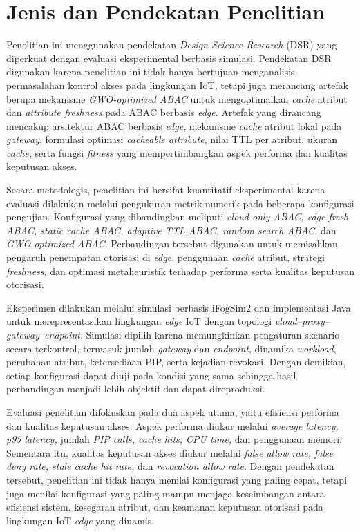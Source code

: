 \section{Jenis dan Pendekatan Penelitian}

Penelitian ini menggunakan pendekatan \textit{Design Science Research} (DSR) yang diperkuat dengan evaluasi eksperimental berbasis simulasi. Pendekatan DSR digunakan karena penelitian ini tidak hanya bertujuan menganalisis permasalahan kontrol akses pada lingkungan IoT, tetapi juga merancang artefak berupa mekanisme \textit{GWO-optimized ABAC} untuk mengoptimalkan \textit{cache} atribut dan \textit{attribute freshness} pada ABAC berbasis \textit{edge}. Artefak yang dirancang mencakup arsitektur ABAC berbasis \textit{edge}, mekanisme \textit{cache} atribut lokal pada \textit{gateway}, formulasi optimasi \textit{cacheable attribute}, nilai TTL per atribut, ukuran \textit{cache}, serta fungsi \textit{fitness} yang mempertimbangkan aspek performa dan kualitas keputusan akses.

Secara metodologis, penelitian ini bersifat kuantitatif eksperimental karena evaluasi dilakukan melalui pengukuran metrik numerik pada beberapa konfigurasi pengujian. Konfigurasi yang dibandingkan meliputi \textit{cloud-only ABAC, edge-fresh ABAC, static cache ABAC, adaptive TTL ABAC, random search ABAC}, dan \textit{GWO-optimized ABAC}. Perbandingan tersebut digunakan untuk memisahkan pengaruh penempatan otorisasi di \textit{edge}, penggunaan \textit{cache} atribut, strategi \textit{freshness}, dan optimasi metaheuristik terhadap performa serta kualitas keputusan otorisasi.

Eksperimen dilakukan melalui simulasi berbasis iFogSim2 dan implementasi Java untuk merepresentasikan lingkungan \textit{edge} IoT dengan topologi \textit{cloud–proxy–gateway–endpoint}. Simulasi dipilih karena memungkinkan pengaturan skenario secara terkontrol, termasuk jumlah \textit{gateway} dan \textit{endpoint}, dinamika \textit{workload}, perubahan atribut, ketersediaan PIP, serta kejadian revokasi. Dengan demikian, setiap konfigurasi dapat diuji pada kondisi yang sama sehingga hasil perbandingan menjadi lebih objektif dan dapat direproduksi.

Evaluasi penelitian difokuskan pada dua aspek utama, yaitu efisiensi performa dan kualitas keputusan akses. Aspek performa diukur melalui \textit{average latency, p95 latency,} jumlah \textit{PIP calls, cache hits, CPU time,} dan penggunaan memori. Sementara itu, kualitas keputusan akses diukur melalui \textit{false allow rate, false deny rate, stale cache hit rate,} dan \textit{revocation allow rate}. Dengan pendekatan tersebut, penelitian ini tidak hanya menilai konfigurasi yang paling cepat, tetapi juga menilai konfigurasi yang paling mampu menjaga keseimbangan antara efisiensi sistem, kesegaran atribut, dan keamanan keputusan otorisasi pada lingkungan IoT \textit{edge} yang dinamis.